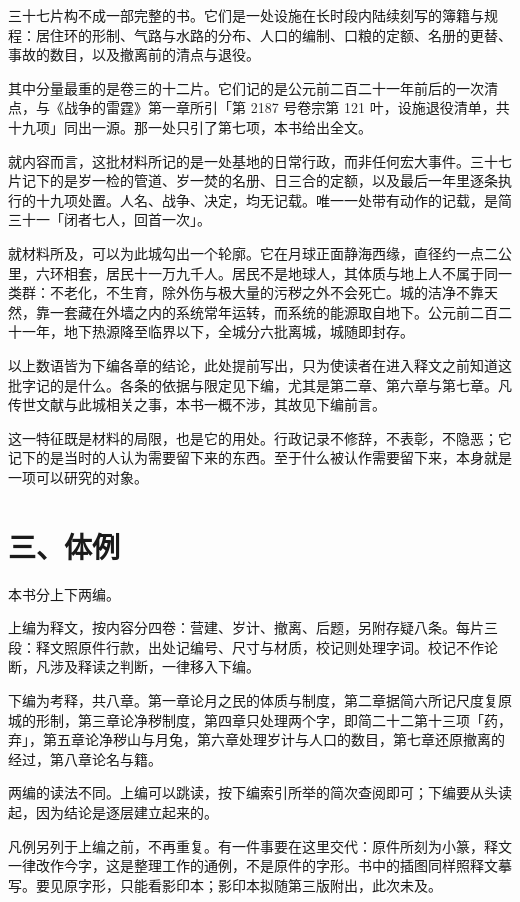 三十七片构不成一部完整的书。它们是一处设施在长时段内陆续刻写的簿籍与规程：居住环的形制、气路与水路的分布、人口的编制、口粮的定额、名册的更替、事故的数目，以及撤离前的清点与退役。

其中分量最重的是卷三的十二片。它们记的是公元前二百二十一年前后的一次清点，与《战争的雷霆》第一章所引「第 2187 号卷宗第 121 叶，设施退役清单，共十九项」同出一源。那一处只引了第七项，本书给出全文。

就内容而言，这批材料所记的是一处基地的日常行政，而非任何宏大事件。三十七片记下的是岁一检的管道、岁一焚的名册、日三合的定额，以及最后一年里逐条执行的十九项处置。人名、战争、决定，均无记载。唯一一处带有动作的记载，是简三十一「闭者七人，回首一次」。

就材料所及，可以为此城勾出一个轮廓。它在月球正面静海西缘，直径约一点二公里，六环相套，居民十一万九千人。居民不是地球人，其体质与地上人不属于同一类群：不老化，不生育，除外伤与极大量的污秽之外不会死亡。城的洁净不靠天然，靠一套藏在外墙之内的系统常年运转，而系统的能源取自地下。公元前二百二十一年，地下热源降至临界以下，全城分六批离城，城随即封存。

以上数语皆为下编各章的结论，此处提前写出，只为使读者在进入释文之前知道这批字记的是什么。各条的依据与限定见下编，尤其是第二章、第六章与第七章。凡传世文献与此城相关之事，本书一概不涉，其故见下编前言。

这一特征既是材料的局限，也是它的用处。行政记录不修辞，不表彰，不隐恶；它记下的是当时的人认为需要留下来的东西。至于什么被认作需要留下来，本身就是一项可以研究的对象。

\section*{三、体例}

本书分上下两编。

上编为释文，按内容分四卷：营建、岁计、撤离、后题，另附存疑八条。每片三段：释文照原件行款，出处记编号、尺寸与材质，校记则处理字词。校记不作论断，凡涉及释读之判断，一律移入下编。

下编为考释，共八章。第一章论月之民的体质与制度，第二章据简六所记尺度复原城的形制，第三章论净秽制度，第四章只处理两个字，即简二十二第十三项「药，弃」，第五章论净秽山与月兔，第六章处理岁计与人口的数目，第七章还原撤离的经过，第八章论名与籍。

两编的读法不同。上编可以跳读，按下编索引所举的简次查阅即可；下编要从头读起，因为结论是逐层建立起来的。

凡例另列于上编之前，不再重复。有一件事要在这里交代：原件所刻为小篆，释文一律改作今字，这是整理工作的通例，不是原件的字形。书中的插图同样照释文摹写。要见原字形，只能看影印本；影印本拟随第三版附出，此次未及。

